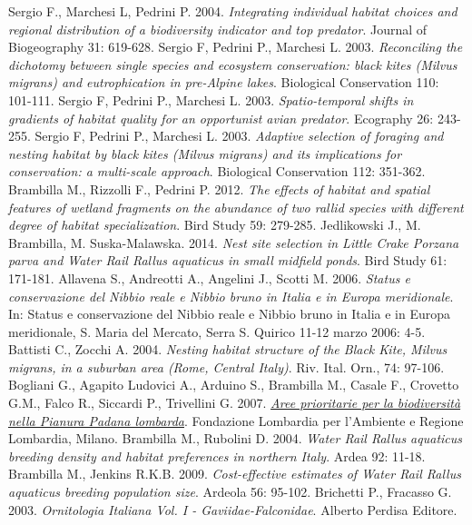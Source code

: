 \documentclass[10pt,twoside,openany,x11names,svgnames,italian,a5paper,dvipsnames,table]{memoir}
\begin{document}
\begin{thebibliography}{9}
 Sergio F., Marchesi L, Pedrini P. 2004. \emph{Integrating individual habitat choices and regional distribution of a biodiversity indicator and top predator}. Journal of Biogeography 31: 619-628.
 Sergio F, Pedrini P., Marchesi L. 2003. \emph{Reconciling the dichotomy between single species and ecosystem conservation: black kites (\emph{Milvus migrans}) and eutrophication in pre-Alpine lakes}. Biological Conservation 110: 101-111.
 Sergio F, Pedrini P., Marchesi L. 2003. \emph{Spatio-temporal shifts in gradients of habitat quality for an opportunist avian predator}. Ecography 26: 243-255.
 Sergio F, Pedrini P., Marchesi L. 2003. \emph{Adaptive selection of foraging and nesting habitat by black kites (\emph{Milvus migrans}) and its implications for conservation: a multi-scale approach}. Biological Conservation 112: 351-362.
 Brambilla M., Rizzolli F., Pedrini P. 2012. \emph{The effects of habitat and spatial features of wetland fragments on the abundance of two rallid species with different degree of habitat specialization}. Bird Study 59: 279-285.
 Jedlikowski J., M. Brambilla, M. Suska-Malawska. 2014. \emph{Nest site selection in Little Crake \emph{Porzana parva} and Water Rail \emph{Rallus aquaticus} in small midfield ponds}. Bird Study 61: 171-181.
 Allavena S., Andreotti A., Angelini J., Scotti M. 2006. \emph{Status e conservazione del Nibbio reale e Nibbio bruno in Italia e in Europa meridionale}. In: Status e conservazione del Nibbio reale e Nibbio bruno in Italia e in Europa meridionale, S. Maria del Mercato, Serra S. Quirico 11-12 marzo 2006: 4-5.
 Battisti C., Zocchi A. 2004. \emph{Nesting habitat structure of the Black Kite, Milvus migrans, in a suburban area (Rome, Central Italy)}. Riv. Ital. Orn., 74: 97-106.
 Bogliani G., Agapito Ludovici A., Arduino S., Brambilla M., Casale F., Crovetto G.M., Falco R., Siccardi P., Trivellini G. 2007. \href{http://www.flanet.org/it/95/pubblicazione/aree-prioritarie-la-biodiversit%C3%A0-nella-pianura-padana-lombarda}{\emph{Aree prioritarie per la biodiversità nella Pianura Padana lombarda}}. Fondazione Lombardia per l’Ambiente e Regione Lombardia, Milano.
 Brambilla M., Rubolini D. 2004. \emph{Water Rail Rallus aquaticus breeding density and habitat preferences in northern Italy}. Ardea 92: 11-18.
 Brambilla M., Jenkins R.K.B. 2009. \emph{Cost-effective estimates of Water Rail Rallus aquaticus breeding population size}. Ardeola 56: 95-102.
 Brichetti P., Fracasso G. 2003. \emph{Ornitologia Italiana Vol. I - Gaviidae-Falconidae}. Alberto Perdisa Editore.
\end{thebibliography}
\end{document}
